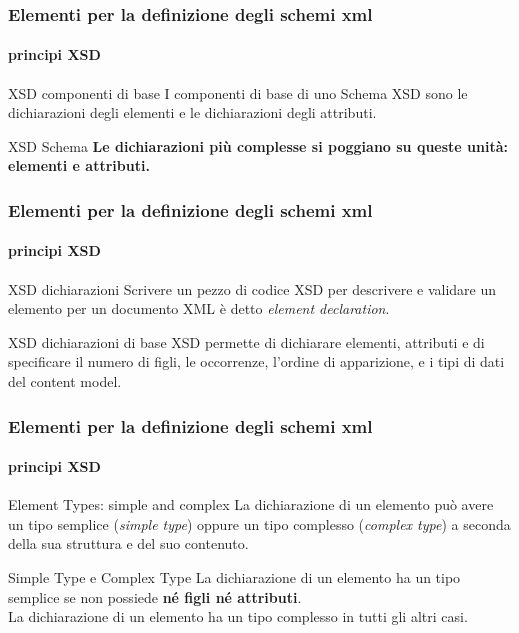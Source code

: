 \begin{frame}
	\frametitle{Elementi per la definizione degli schemi xml}
	\framesubtitle{principi XSD}
	\addtocounter{nframe}{1}

	\begin{block}{XSD componenti di base}
		I componenti di base di uno Schema XSD sono le dichiarazioni degli elementi e le dichiarazioni degli attributi.
	\end{block}

	\begin{block}{XSD Schema}
		\textbf{Le dichiarazioni più complesse si poggiano su queste unità: elementi e attributi.}
	\end{block}

\end{frame}

\begin{frame}
	\frametitle{Elementi per la definizione degli schemi xml}
	\framesubtitle{principi XSD}
	\addtocounter{nframe}{1}

	\begin{block}{XSD dichiarazioni}
		Scrivere un pezzo di codice XSD per descrivere e validare un elemento per un documento XML è detto \textit{element declaration}.
	\end{block}

	\begin{block}{XSD dichiarazioni di base}
		XSD permette di dichiarare elementi, attributi e di specificare il numero di figli, le occorrenze, l'ordine di apparizione, e i tipi di dati del content model.
	\end{block}

\end{frame}


\begin{frame}
	\frametitle{Elementi per la definizione degli schemi xml}
	\framesubtitle{principi XSD}
	\addtocounter{nframe}{1}

	\begin{block}{Element Types: simple and complex}
		La dichiarazione di un elemento può avere un tipo semplice (\textit{simple type}) oppure un tipo complesso (\textit{complex type}) a seconda della sua struttura e del suo contenuto.


	\end{block}

	\begin{block}{Simple Type e Complex Type}
		La dichiarazione di un elemento ha un tipo semplice se non possiede \textbf{né figli né attributi}.
		\\ La dichiarazione di un elemento ha un tipo complesso in tutti gli altri casi.
	\end{block}

\end{frame}


